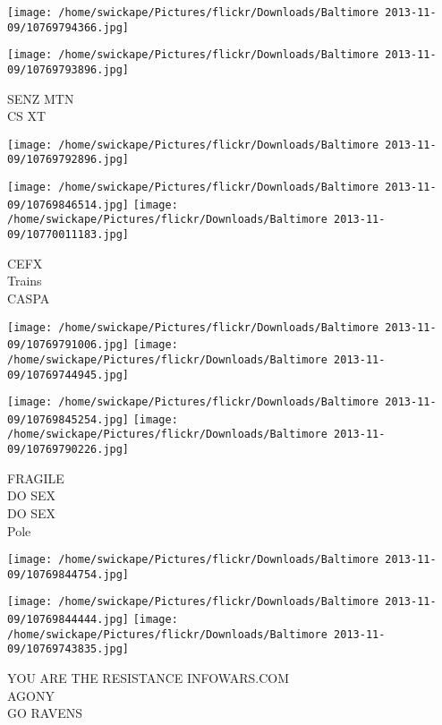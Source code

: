\documentclass[10pt,letterpaper]{article}
\begin{document}
\texttt{[image: /home/swickape/Pictures/flickr/Downloads/Baltimore 2013-11-09/10769794366.jpg]}

\vspace{0.25in}
\texttt{[image: /home/swickape/Pictures/flickr/Downloads/Baltimore 2013-11-09/10769793896.jpg]}

SENZ MTN\\
CS XT\\
\pagebreak

\texttt{[image: /home/swickape/Pictures/flickr/Downloads/Baltimore 2013-11-09/10769792896.jpg]}

\vspace{0.25in}
\texttt{[image: /home/swickape/Pictures/flickr/Downloads/Baltimore 2013-11-09/10769846514.jpg]}
\texttt{[image: /home/swickape/Pictures/flickr/Downloads/Baltimore 2013-11-09/10770011183.jpg]}

CEFX\\
Trains\\
CASPA\\
\pagebreak

\texttt{[image: /home/swickape/Pictures/flickr/Downloads/Baltimore 2013-11-09/10769791006.jpg]}
\texttt{[image: /home/swickape/Pictures/flickr/Downloads/Baltimore 2013-11-09/10769744945.jpg]}

\texttt{[image: /home/swickape/Pictures/flickr/Downloads/Baltimore 2013-11-09/10769845254.jpg]}
\texttt{[image: /home/swickape/Pictures/flickr/Downloads/Baltimore 2013-11-09/10769790226.jpg]}

FRAGILE\\
DO SEX\\
DO SEX\\
Pole\\
\pagebreak

\texttt{[image: /home/swickape/Pictures/flickr/Downloads/Baltimore 2013-11-09/10769844754.jpg]}

\vspace{0.25in}
\texttt{[image: /home/swickape/Pictures/flickr/Downloads/Baltimore 2013-11-09/10769844444.jpg]}
\texttt{[image: /home/swickape/Pictures/flickr/Downloads/Baltimore 2013-11-09/10769743835.jpg]}

YOU ARE THE RESISTANCE INFOWARS.COM\\
AGONY\\
GO RAVENS\\
\pagebreak
\end{document}
